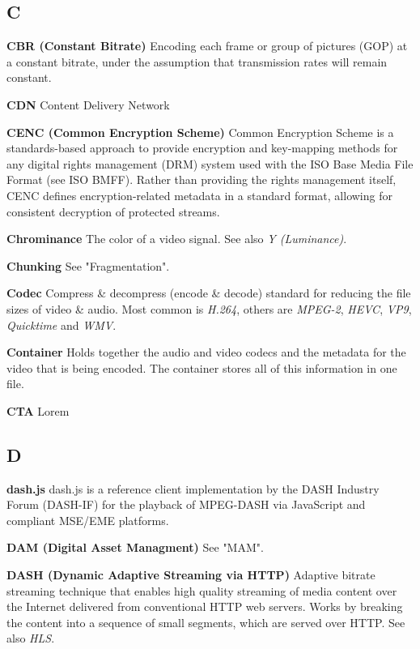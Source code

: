 \subsection{C}

\smallskip
\textbf{CBR (Constant Bitrate)}
Encoding each frame or group of pictures (GOP) at a constant bitrate, under the assumption that transmission rates will remain constant.

\smallskip
\textbf{CDN}
Content Delivery Network

\smallskip
\textbf{CENC (Common Encryption Scheme)}
Common Encryption Scheme is a standards-based approach to provide encryption and key-mapping methods for any digital rights management (DRM) system used with the ISO Base Media File Format (see ISO BMFF). Rather than providing the rights management itself, CENC defines encryption-related metadata in a standard format, allowing for consistent decryption of protected streams.

\smallskip
\textbf{Chrominance}
The color of a video signal. See also \textit{Y (Luminance)}.

\smallskip
\textbf{Chunking}
See "Fragmentation".

\smallskip
\textbf{Codec}
Compress \& decompress (encode \& decode) standard for reducing the file sizes of video \& audio. Most common is \textit{H.264}, others are \textit{MPEG-2}, \textit{HEVC}, \textit{VP9}, \textit{Quicktime} and \textit{WMV}.

\smallskip
\textbf{Container}
Holds together the audio and video codecs and the metadata for the video that is being encoded. The container stores all of this information in one file.

\smallskip
\textbf{CTA}
Lorem

\subsection{D}

\smallskip
\textbf{dash.js}
dash.js is a reference client implementation by the DASH Industry Forum (DASH-IF) for the playback of MPEG-DASH via JavaScript and compliant MSE/EME platforms.

\smallskip
\textbf{DAM (Digital Asset Managment)}
See "MAM".

\smallskip
\textbf{DASH (Dynamic Adaptive Streaming via HTTP)}
Adaptive bitrate streaming technique that enables high quality streaming of media content over the Internet delivered from conventional HTTP web servers. Works by breaking the content into a sequence of small segments, which are served over HTTP. See also \textit{HLS}.


